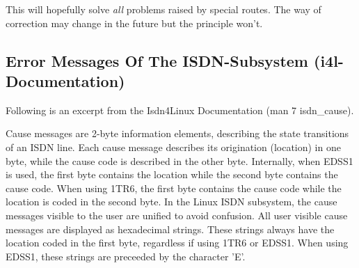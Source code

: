 This will hopefully solve \emph{all} problems raised by special routes. 
The way of correction may change in the future but the principle won't.

{
  \subsection{Error Messages Of The ISDN-Subsystem (i4l-Documentation)}
}

Following is an excerpt from the Isdn4Linux Documentation (man 7
isdn\_cause). 

Cause messages are 2-byte information elements, describing the state
transitions of an ISDN line. Each cause message describes its
origination (location) in one byte, while the cause code is described
in the other byte. Internally, when EDSS1 is used, the first byte
contains the location while the second byte contains the cause code.
When using 1TR6, the first byte contains the cause code while the
location is coded in the second byte. In the Linux ISDN subsystem, the
cause messages visible to the user are unified to avoid confusion. All
user visible cause messages are displayed as hexadecimal strings.
These strings always have the location coded in the first byte,
regardless if using 1TR6 or EDSS1. When using EDSS1, these strings are
preceeded by the character 'E'.


